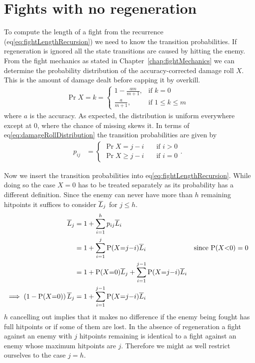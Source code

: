 \section{Fights with no regeneration}\label{chap:noregen}
To compute the length of a fight from the recurrence (eq\ref{eq:fightLengthRecursion}) we need to know the transition probabilities. If regeneration is ignored all the state transitions are caused by hitting the enemy. From the fight mechanics as stated in Chapter~\ref{chap:fightMechanics} we can determine the probability distribution of the accuracy-corrected damage roll $X$. This is the amount of damage dealt before capping it by overkill.
\begin{align}
	\Pr{X = k} =
	\begin{cases}
		1 - \frac{am}{m+1}, &\mbox{if } k = 0 \\
		\frac{a}{m+1},      &\mbox{if }1 \leq k \leq m
	\end{cases}\label{eq:damageRollDistribution}
\end{align}
where $a$ is the accuracy. As expected, the distribution is uniform everywhere except at 0, where the chance of missing skews it. In terms of eq\ref{eq:damageRollDistribution} the transition probabilities are given by
\begin{align}
    p_{ij}
         &= \begin{cases}
            \Pr{X = j-i} \quad &\mbox{if } i > 0 \\
            \Pr{X \geq j-i} \quad &\mbox{if } i = 0
        \end{cases}\label{eq:damageDistribution}.
\end{align}

Now we insert the transition probabilities into eq\ref{eq:fightLengthRecursion}. While doing so the case $X=0$ has to be treated separately as its probability has a different definition. Since the enemy can never have more than $h$ remaining hitpoints it suffices to consider $\overline{L}_j$ for $j \leq h$.
\begin{align}
    \L_j
        &= 1 + \sum_{i=1}^h p_{ij}\L_i\nonumber\\
        &= 1 + \sum_{i=1}^j \Pr{X = j-i}\L_i \qquad &\mbox{since $\Pr{X<0} = 0$}\nonumber\\
        &= 1 + \Pr{X=0}\L_j + \sum_{i=1}^{j-1} \Pr{X = j-i}\L_i\nonumber\\
    \implies \left(1 - \Pr{X=0}\right)\L_j &= 1 + \sum_{i=1}^{j-1} \Pr{X = j-i}\L_i\label{eq:noregen1}
\end{align}
$h$ cancelling out implies that it makes no difference if the enemy being fought has full hitpoints or if some of them are lost. In the absence of regeneration a fight against an enemy with $j$ hitpoints remaining is identical to a fight against an enemy whose maximum hitpoints are $j$. Therefore we might as well restrict ourselves to the case $j=h$.

